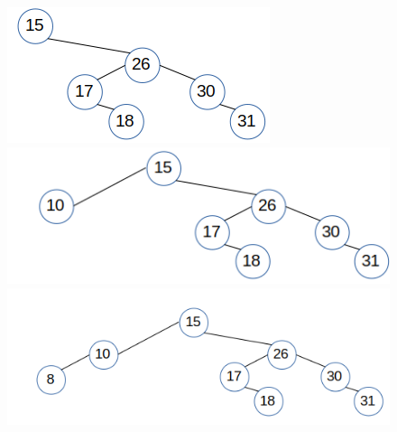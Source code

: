 \documentclass{article}
\begin{document}
\begin{enumerate}
\begin{figure}[H]
	\includegraphics[]{P10/5-18}
	\includegraphics[]{P10/6-10}
	\includegraphics[]{P10/7-8}
\end{figure}


\end{enumerate}
\end{document}
